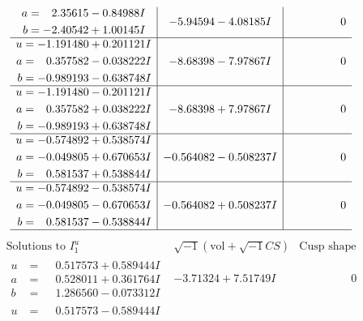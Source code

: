 \documentclass[1p]{elsarticle_modified}
\theoremstyle{definition}
\newcommand{\I}{\sqrt{-1}}
\begin{document}
$$\begin{array}{c|c|c}
\begin{aligned}
a &= \phantom{-}2.35615 - 0.84988 I \\
b &= -2.40542 + 1.00145 I\end{aligned}
 & -5.94594 - 4.08185 I & \phantom{-0.000000 } 0 \\ \hline\begin{aligned}
u &= -1.191480 + 0.201121 I \\
a &= \phantom{-}0.357582 - 0.038222 I \\
b &= -0.989193 - 0.638748 I\end{aligned}
 & -8.68398 - 7.97867 I & \phantom{-0.000000 } 0 \\ \hline\begin{aligned}
u &= -1.191480 - 0.201121 I \\
a &= \phantom{-}0.357582 + 0.038222 I \\
b &= -0.989193 + 0.638748 I\end{aligned}
 & -8.68398 + 7.97867 I & \phantom{-0.000000 } 0 \\ \hline\begin{aligned}
u &= -0.574892 + 0.538574 I \\
a &= -0.049805 + 0.670653 I \\
b &= \phantom{-}0.581537 + 0.538844 I\end{aligned}
 & -0.564082 - 0.508237 I & \phantom{-0.000000 } 0 \\ \hline\begin{aligned}
u &= -0.574892 - 0.538574 I \\
a &= -0.049805 - 0.670653 I \\
b &= \phantom{-}0.581537 - 0.538844 I\end{aligned}
 & -0.564082 + 0.508237 I & \phantom{-0.000000 } 0\\
 \hline 
 \end{array}$$\newpage$$\begin{array}{c|c|c}  
\text{Solutions to }I^u_{1}& \I (\text{vol} + \sqrt{-1}CS) & \text{Cusp shape}\\
 \hline 
\begin{aligned}
u &= \phantom{-}0.517573 + 0.589444 I \\
a &= \phantom{-}0.528011 + 0.361764 I \\
b &= \phantom{-}1.286560 - 0.073312 I\end{aligned}
 & -3.71324 + 7.51749 I & \phantom{-0.000000 } 0 \\ \hline\begin{aligned}
u &= \phantom{-}0.517573 - 0.589444 I \\

\end{aligned}
\end{array}$$
\end{document}

